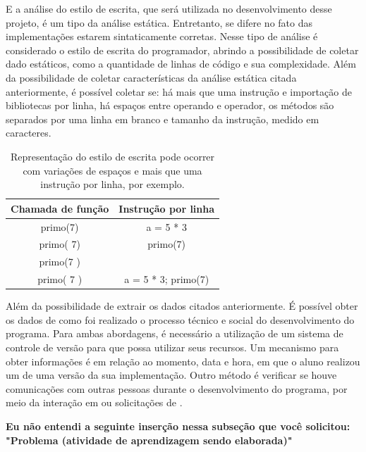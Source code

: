 			E a análise do estilo de escrita, que será utilizada no desenvolvimento desse projeto,
			é um tipo da análise estática. Entretanto, se difere no fato das implementações estarem
			sintaticamente corretas. Nesse tipo de análise é considerado o estilo de escrita do
			programador, abrindo a possibilidade de coletar dado estáticos, como a quantidade de
			linhas de código e sua complexidade. Além da possibilidade de coletar
			características da análise estática citada anteriormente, é possível coletar se:
			há mais que uma instrução e importação de bibliotecas por linha, há espaços entre
			operando e operador, os métodos são separados por uma linha em branco e tamanho
			da instrução, medido em caracteres.
			
			\begin{table}
				\centering
				\begin{tabular}{|c|c|}
					\hline
					Chamada de função & Instrução por linha \\ \hline
					primo(7)          & a = 5 * 3  \\
					primo( 7)         & primo(7)     \\
					primo(7 )         &      \\
					primo( 7 )        & a = 5 * 3; primo(7)    \\
					\hline
				\end{tabular}
				\captionsetup{justification=centering}
				\caption[Representação do estilo de escrita]{Representação do estilo
				de escrita pode ocorrer com variações de espaços e mais que uma
				instrução por linha, por exemplo.}
			\end{table}
			
			Além da possibilidade de extrair os dados citados anteriormente. É possível
			obter os dados de como foi realizado o processo técnico e social do desenvolvimento
			do programa. Para ambas abordagens, é necessário a utilização de um sistema de
			controle de versão para que possa utilizar seus recursos. Um mecanismo para
			obter informações é em relação ao momento, data e hora, em que o aluno realizou
			um  de uma versão da sua implementação. Outro método é verificar
			se houve comunicações com outras pessoas durante o desenvolvimento do programa,
			por meio da interação em  ou solicitações de .
			
			\textbf{Eu não entendi a seguinte inserção nessa subseção que você solicitou:
				"Problema (atividade de aprendizagem sendo elaborada)"}

